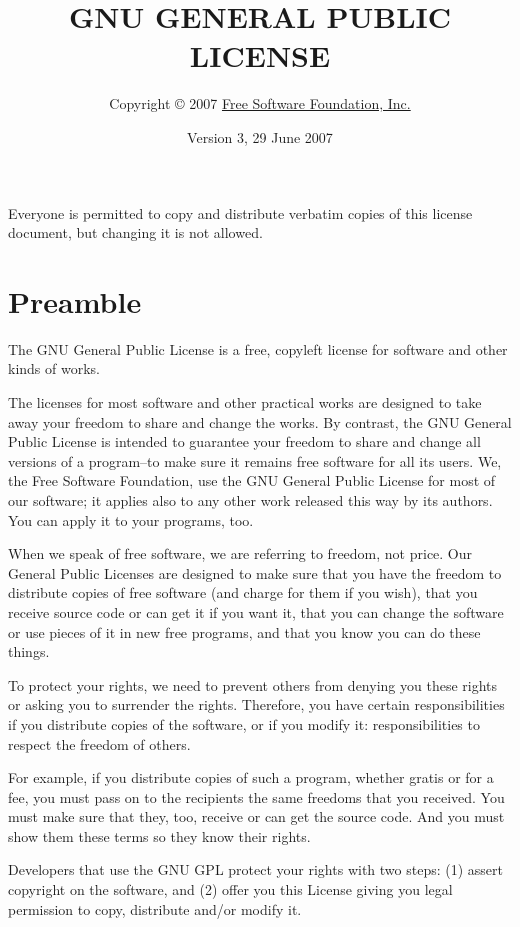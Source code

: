 \documentclass[11pt,a4paper]{article}
\title{GNU GENERAL PUBLIC LICENSE}
\author{Copyright © 2007 \href{http://fsf.org/}{Free Software Foundation, Inc.}}
\date{Version 3, 29 June 2007}
\begin{document}
\maketitle

Everyone is permitted to copy and distribute verbatim copies of this
license document, but changing it is not allowed.

\part*{Preamble}

The GNU General Public License is a free, copyleft license for software
and other kinds of works.

The licenses for most software and other practical works are designed to
take away your freedom to share and change the works. By contrast, the
GNU General Public License is intended to guarantee your freedom to
share and change all versions of a program--to make sure it remains free
software for all its users. We, the Free Software Foundation, use the
GNU General Public License for most of our software; it applies also to
any other work released this way by its authors. You can apply it to
your programs, too.

When we speak of free software, we are referring to freedom, not price.
Our General Public Licenses are designed to make sure that you have the
freedom to distribute copies of free software (and charge for them if
you wish), that you receive source code or can get it if you want it,
that you can change the software or use pieces of it in new free
programs, and that you know you can do these things.

To protect your rights, we need to prevent others from denying you these
rights or asking you to surrender the rights. Therefore, you have
certain responsibilities if you distribute copies of the software, or if
you modify it: responsibilities to respect the freedom of others.

For example, if you distribute copies of such a program, whether gratis
or for a fee, you must pass on to the recipients the same freedoms that
you received. You must make sure that they, too, receive or can get the
source code. And you must show them these terms so they know their
rights.

Developers that use the GNU GPL protect your rights with two steps: (1)
assert copyright on the software, and (2) offer you this License giving
you legal permission to copy, distribute and/or modify it.
\end{document}

